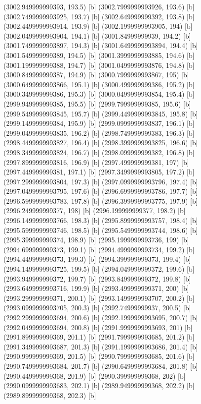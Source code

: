 {{{(3002.949999999393, 193.5) [b] 
(3002.7999999993926, 193.6) [b] 
(3002.7499999993925, 193.7) [b] 
(3002.649999999392, 193.8) [b] 
(3002.4499999993914, 193.9) [b] 
(3002.1999999993905, 194) [b] 
(3002.0499999993904, 194.1) [b] 
(3001.84999999939, 194.2) [b] 
(3001.7499999993897, 194.3) [b] 
(3001.6499999993894, 194.4) [b] 
(3001.549999999389, 194.5) [b] 
(3001.3999999993885, 194.6) [b] 
(3001.199999999388, 194.7) [b] 
(3001.0499999993876, 194.8) [b] 
(3000.849999999387, 194.9) [b] 
(3000.7999999993867, 195) [b] 
(3000.6499999993866, 195.1) [b] 
(3000.499999999386, 195.2) [b] 
(3000.349999999386, 195.3) [b] 
(3000.0499999993854, 195.4) [b] 
(2999.949999999385, 195.5) [b] 
(2999.799999999385, 195.6) [b] 
(2999.5499999993845, 195.7) [b] 
(2999.4499999993845, 195.8) [b] 
(2999.149999999384, 195.9) [b] 
(2999.0999999993837, 196.1) [b] 
(2999.0499999993835, 196.2) [b] 
(2998.749999999383, 196.3) [b] 
(2998.4499999993827, 196.4) [b] 
(2998.3999999993825, 196.6) [b] 
(2998.3499999993824, 196.7) [b] 
(2998.099999999382, 196.8) [b] 
(2997.8999999993816, 196.9) [b] 
(2997.499999999381, 197) [b] 
(2997.449999999381, 197.1) [b] 
(2997.3499999993805, 197.2) [b] 
(2997.2999999993804, 197.3) [b] 
(2997.0999999993796, 197.4) [b] 
(2997.0499999993795, 197.6) [b] 
(2996.6999999993786, 197.7) [b] 
(2996.5999999993783, 197.8) [b] 
(2996.3999999993775, 197.9) [b] 
(2996.249999999377, 198) [b] 
(2996.199999999377, 198.2) [b] 
(2996.1499999993766, 198.3) [b] 
(2995.8999999993757, 198.4) [b] 
(2995.5999999993746, 198.5) [b] 
(2995.5499999993744, 198.6) [b] 
(2995.399999999374, 198.9) [b] 
(2995.1999999993736, 199) [b] 
(2994.699999999373, 199.1) [b] 
(2994.4999999993734, 199.2) [b] 
(2994.449999999373, 199.3) [b] 
(2994.399999999373, 199.4) [b] 
(2994.1499999993725, 199.5) [b] 
(2994.049999999372, 199.6) [b] 
(2993.949999999372, 199.7) [b] 
(2993.849999999372, 199.8) [b] 
(2993.6499999993716, 199.9) [b] 
(2993.499999999371, 200) [b] 
(2993.299999999371, 200.1) [b] 
(2993.1499999993707, 200.2) [b] 
(2993.0999999993705, 200.3) [b] 
(2992.74999999937, 200.5) [b] 
(2992.2999999993694, 200.6) [b] 
(2992.1999999993695, 200.7) [b] 
(2992.0499999993694, 200.8) [b] 
(2991.9999999993693, 201) [b] 
(2991.899999999369, 201.1) [b] 
(2991.7999999993685, 201.2) [b] 
(2991.3499999993687, 201.3) [b] 
(2991.1999999993686, 201.4) [b] 
(2990.999999999369, 201.5) [b] 
(2990.7999999993685, 201.6) [b] 
(2990.7499999993684, 201.7) [b] 
(2990.6499999993684, 201.8) [b] 
(2990.449999999368, 201.9) [b] 
(2990.399999999368, 202) [b] 
(2990.0999999993683, 202.1) [b] 
(2989.949999999368, 202.2) [b] 
(2989.899999999368, 202.3) [b] 
}}}
